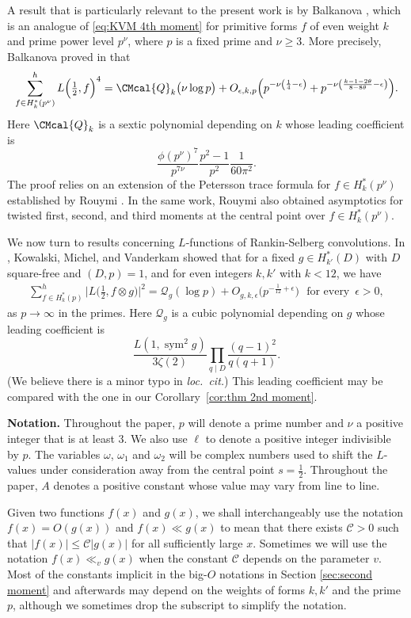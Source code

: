 \documentclass[12pt]{amsart}
\theoremstyle{plain}
\theoremstyle{definition}
\begin{document}
A result that is particularly relevant to the present work is by Balkanova \cite[Corollary 1.5]{Balkanova}, which is an analogue of \eqref{eq:KVM 4th moment} for primitive forms $f$ of even weight $k$ and prime power level $p^\nu$, where $p$ is a fixed prime and $\nu\ge 3$. More precisely, Balkanova proved in \cite{Balkanova}  that
\[
\sum_{f\in H_k^*(p^\nu)}^h
L\Big(\tfrac12,f\Big)^4
=
\CMcal{Q}_k\big(\nu\log p\big)
+
O_{\epsilon,k,p}\Big(
p^{-\nu\left(\frac14-\epsilon\right)}
+
p^{-\nu\left(\frac{k-1-2\theta}{8-8\theta}-\epsilon\right)}
\Big).
\]
Here $\CMcal{Q}_k$ is a sextic polynomial depending on $k$ whose leading coefficient is
\[
\frac{\phi(p^\nu)^7}{p^{7\nu}}
\frac{p^2-1}{p^2}
\frac{1}{60\pi^2}.
\]
The  proof relies on an extension of the Petersson trace formula for $f\in H_k^*(p^\nu)$ established by Rouymi \cite{Rouymi}. In the same work, Rouymi also obtained asymptotics for twisted first, second, and third moments at the central point over $f\in H_k^*(p^\nu)$.

We now turn to results concerning $L$-functions of Rankin-Selberg convolutions. In \cite{KMV RS}, Kowalski, Michel, and Vanderkam showed that for a fixed $g\in H^*_{k'}(D)$ with $D$ square-free and $(D,p)=1$, and for even integers $k,k'$ with $k<12$,  we have
\begin{align*}
\sum_{f\in H_k^*(p)}^h
\Big|L\Big(\tfrac12,f\otimes g\Big)\Big|^2
=\mathcal{Q}_g(\log p)
+O_{g,k,\epsilon}\big(p^{-\frac{1}{12}+\epsilon}\big) \,\, \text{ for every }\, \epsilon>0,
\end{align*}
as $p\to\infty$ in the primes. Here $\mathcal{Q}_g$ is a cubic polynomial depending on $g$ whose leading coefficient is
\[
\frac{L(1,\operatorname{sym}^2 g)}{3\zeta(2)}
\prod_{q\mid D}\frac{(q-1)^2}{q(q+1)}.
\]
(We believe there is a minor typo in \emph{loc.\ cit.}) This leading coefficient may be compared with the one in our Corollary~\ref{cor:thm 2nd moment}.





\noindent \textbf{Notation.} 
Throughout the paper, $p$ will denote a prime number and $\nu$ a positive integer that is at least $3$. We also use $\ell$ to denote a positive integer indivisible by $p.$ The variables $\omega$,  $\omega_1$ and $\omega_2$ will be complex numbers used to shift the $L$-values under consideration away from the central point $s=\frac12$. Throughout the paper, $A$ denotes a positive constant whose value may vary from line to line.

Given two functions $f(x)$ and $g(x)$, we shall interchangeably use the notation  $f(x)=O(g(x))$ and $f(x) \ll g(x)$  to mean that there exists $ \mathcal{C} >0$ such that $|f(x)| \le \mathcal{C} |g(x)|$ for all sufficiently large $x$. Sometimes we will use the notation $f(x)\ll_v  g(x)$ when the constant $ \mathcal{C}$ depends on the parameter $v.$ Most of the constants implicit in the big-$O$ notations in Section \ref{sec:second moment} and afterwards may depend on the weights of forms $k,k'$ and the prime $p$, although we sometimes drop the subscript to simplify the notation.     
    
\end{document}
